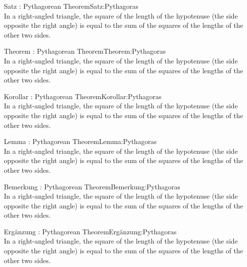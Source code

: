 	\begin{proposition}{Satz \currentboxsection: Pythagorean Theorem}{Satz:Pythagoras} \label{satz:Pythagoras} \\
		In a right-angled triangle, the square of the length of the hypotenuse (the side opposite the right angle) is equal to the sum of the squares of the lengths of the other two sides.
	\end{proposition}
	
	\begin{theorem}{Theorem \currentboxsection: Pythagorean Theorem}{Theorem:Pythagoras} \label{theor:Pythagoras} \\
		In a right-angled triangle, the square of the length of the hypotenuse (the side opposite the right angle) is equal to the sum of the squares of the lengths of the other two sides.
	\end{theorem}
	
	\begin{corollary}{Korollar \currentboxsection: Pythagorean Theorem}{Korollar:Pythagoras} \label{coro:Pythagoras} \\
		In a right-angled triangle, the square of the length of the hypotenuse (the side opposite the right angle) is equal to the sum of the squares of the lengths of the other two sides.
	\end{corollary}
	
	\begin{lemma}{Lemma \currentboxsection: Pythagorean Theorem}{Lemma:Pythagoras} \label{lemma:Pythagoras} \\
		In a right-angled triangle, the square of the length of the hypotenuse (the side opposite the right angle) is equal to the sum of the squares of the lengths of the other two sides.
	\end{lemma}
	
	\begin{remark}{Bemerkung \currentboxsection: Pythagorean Theorem}{Bemerkung:Pythagoras} \label{rem:Pythagoras} \\
		In a right-angled triangle, the square of the length of the hypotenuse (the side opposite the right angle) is equal to the sum of the squares of the lengths of the other two sides.
	\end{remark}
	
	\begin{supplement}{Ergänzung \currentboxsection: Pythagorean Theorem}{Ergänzung:Pythagoras} \label{supp:Pythagoras} \\
		In a right-angled triangle, the square of the length of the hypotenuse (the side opposite the right angle) is equal to the sum of the squares of the lengths of the other two sides.
	\end{supplement}
	
